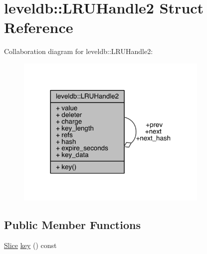 \hypertarget{structleveldb_1_1_l_r_u_handle2}{}\section{leveldb\+:\+:L\+R\+U\+Handle2 Struct Reference}
\label{structleveldb_1_1_l_r_u_handle2}


Collaboration diagram for leveldb\+:\+:L\+R\+U\+Handle2\+:\nopagebreak
\begin{figure}[H]
\begin{center}
\leavevmode
\includegraphics[width=260pt]{structleveldb_1_1_l_r_u_handle2__coll__graph}
\end{center}
\end{figure}
\subsection*{Public Member Functions}
\begin{DoxyCompactItemize}
\item 
\hyperlink{classleveldb_1_1_slice}{Slice} \hyperlink{structleveldb_1_1_l_r_u_handle2_ab68a98fe5a6319cac01b266da1cf2e6a}{key} () const 
\end{DoxyCompactItemize}

